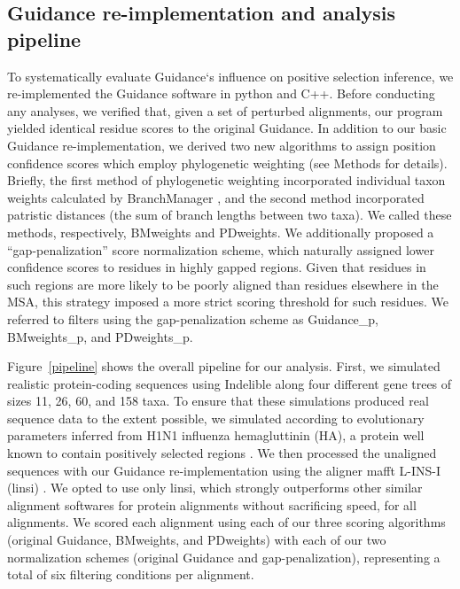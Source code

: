 \documentclass[10pt]{article}
\begin{document}
\subsection*{Guidance re-implementation and analysis pipeline}
To systematically evaluate Guidance`s influence on positive selection inference, we re-implemented the Guidance software in python and C++. Before conducting any analyses, we verified that, given a set of perturbed alignments, our program yielded identical residue scores to the original Guidance. In addition to our basic Guidance re-implementation, we derived two new algorithms to assign position confidence scores which employ phylogenetic weighting (see Methods for details).  Briefly, the first method of phylogenetic weighting incorporated individual taxon weights calculated by BranchManager \citep{Stone2007}, and the second method incorporated patristic distances (the sum of branch lengths between two taxa). We called these methods, respectively, BMweights and PDweights.  We additionally proposed a “gap-penalization” score normalization scheme, which naturally assigned lower confidence scores to residues in highly gapped regions. Given that residues in such regions are more likely to be poorly aligned than residues elsewhere in the MSA, this strategy imposed a more strict scoring threshold for such residues. We referred to filters using the gap-penalization scheme as Guidance_p, BMweights_p, and PDweights_p.

Figure~\ref{pipeline} shows the overall pipeline for our analysis. First, we simulated realistic protein-coding sequences using Indelible \citep{Fletcher2009} along four different gene trees of sizes 11, 26, 60, and 158 taxa. To ensure that these simulations produced real sequence data to the extent possible, we simulated according to evolutionary parameters inferred from H1N1 influenza hemagluttinin (HA), a protein well known to contain positively selected regions \citep{Meyer2012}. We then processed the unaligned sequences with our Guidance re-implementation using the aligner mafft L-INS-I (linsi) \citep{Katoh2005}. We opted to use only linsi, which strongly outperforms other similar alignment softwares for protein alignments \citep{Thompson2011,Nuin2006} without sacrificing speed, for all alignments. We scored each alignment using each of our three scoring algorithms (original Guidance, BMweights, and PDweights) with each of our two normalization schemes (original Guidance and gap-penalization), representing a total of six filtering conditions per alignment.  
\end{document}
